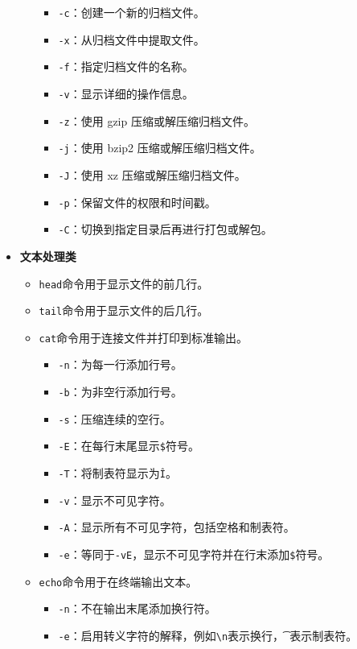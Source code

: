 \documentclass[../main.tex]{subfiles}
\begin{document}
\begin{itemize}
\begin{itemize}
\begin{itemize}
          \item \texttt{-c}：创建一个新的归档文件。
          \item \texttt{-x}：从归档文件中提取文件。
          \item \texttt{-f}：指定归档文件的名称。
          \item \texttt{-v}：显示详细的操作信息。
          \item \texttt{-z}：使用 gzip 压缩或解压缩归档文件。
          \item \texttt{-j}：使用 bzip2 压缩或解压缩归档文件。
          \item \texttt{-J}：使用 xz 压缩或解压缩归档文件。
          \item \texttt{-p}：保留文件的权限和时间戳。
          \item \texttt{-C}：切换到指定目录后再进行打包或解包。
        \end{itemize}
    \end{itemize}
  \item \textbf{文本处理类}
    \begin{itemize}
      \item \texttt{head}命令用于显示文件的前几行。
      \item \texttt{tail}命令用于显示文件的后几行。
      \item \texttt{cat}命令用于连接文件并打印到标准输出。
        \begin{itemize}
          \item \texttt{-n}：为每一行添加行号。
          \item \texttt{-b}：为非空行添加行号。
          \item \texttt{-s}：压缩连续的空行。
          \item \texttt{-E}：在每行末尾显示\texttt{\$}符号。
          \item \texttt{-T}：将制表符显示为\texttt{\^I}。
          \item \texttt{-v}：显示不可见字符。
          \item \texttt{-A}：显示所有不可见字符，包括空格和制表符。
          \item \texttt{-e}：等同于\texttt{-vE}，显示不可见字符并在行末添加\texttt{\$}符号。
        \end{itemize}
      \item \texttt{echo}命令用于在终端输出文本。
        \begin{itemize}
          \item \texttt{-n}：不在输出末尾添加换行符。
          \item \texttt{-e}：启用转义字符的解释，例如\texttt{\textbackslash n}表示换行，\texttt{\t}表示制表符。

\end{itemize}
\end{itemize}
\end{itemize}
\end{document}
